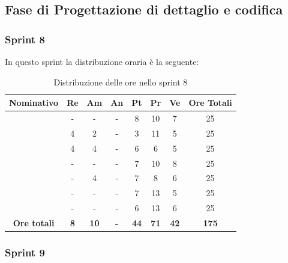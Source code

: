 \subsection{Fase di Progettazione di dettaglio e codifica}

\subsubsection{Sprint 8}

In questo sprint la distribuzione oraria è la seguente:
\begin{table}[H]
		\begin{center}
			\setlength{\aboverulesep}{0pt}
			\setlength{\belowrulesep}{0pt}
			\setlength{\extrarowheight}{.75ex}
			\begin{tabular}{ c c c c c c c c }
				\rowcolor{AzzurroGruppo!30} 
				\textbf{Nominativo} & \textbf{Re} & \textbf{Am} & \textbf{An} & \textbf{Pt} & \textbf{Pr} & \textbf{Ve} & \textbf{Ore Totali}  \\
				\toprule
				\Davide    & - & - & - & 8 & 10 & 7 & 25 \\
				\Giosue    & 4 & 2 & - & 3 & 11 & 5 & 25 \\
				\Francesco & 4 & 4 & - & 6 & 6 & 5 & 25 \\
				\Daniele   & - & - & - & 7 & 10 & 8 & 25 \\
				\Lucrezia  & - & 4 & - & 7 & 8 & 6 & 25 \\
				\Matteo    & - & - & - & 7 & 13 & 5 & 25 \\
				\Tommaso   & - & - & - & 6 & 13 & 6 & 25 \\
				 \textbf{Ore totali} & \textbf{8} & \textbf{10} & \textbf{-} & \textbf{44} & \textbf{71} & \textbf{42} & \textbf{175} \\
				\bottomrule
			\end{tabular}
			\caption{Distribuzione delle ore nello sprint 8}
		\end{center}
	\end{table}


\subsubsection{Sprint 9}

